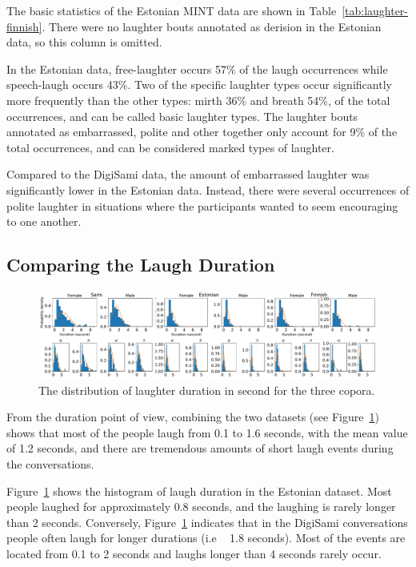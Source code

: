 \documentclass[10pt,journal,compsoc]{IEEEtran}
\begin{document}
The basic statistics of the Estonian MINT data are shown in Table~\ref{tab:laughter-finnish}.
There were no laughter bouts annotated as derision in the Estonian data, so this column is omitted.

In the Estonian data, free-laughter occurs 57\% of the laugh occurrences while speech-laugh occurs 43\%. Two of the specific laughter types occur significantly more frequently than the other types: mirth 36\% and breath 54\%, of the total occurrences, and can be called basic laughter types. The laughter bouts annotated as embarrassed, polite and other together only account for 9\% of the total occurrences, and can be considered marked types of laughter.

Compared to the DigiSami data, the amount of embarrassed laughter was significantly lower in the Estonian data. Instead, there were several occurrences of polite laughter in situations where the participants wanted to seem encouraging to one another.

\subsection{Comparing the Laugh Duration}
\label{sec:laugh-duration}

\begin{figure}[!t]
\centering
\includegraphics[width=1.02\linewidth]{figures/laugh_dist.pdf}
\caption{The distribution of laughter duration in second for the three copora.}
\label{fig:laugh-distribution}
\end{figure}

From the duration point of view, combining the two datasets (see Figure~\ref{fig:laugh-distribution}) shows that most of the people laugh from 0.1 to 1.6 seconds, with the mean value of 1.2 seconds, and there are tremendous amounts of short laugh events during the conversations.

Figure~\ref{fig:laugh-distribution} shows the histogram of laugh duration in the Estonian dataset.
Most people laughed for approximately 0.8 seconds, and the laughing is rarely longer than 2 seconds.
Conversely, Figure~\ref{fig:laugh-distribution} indicates that in the DigiSami conversations people often laugh for longer durations (i.e ~ 1.8 seconds). Most of the events are located from 0.1 to 2 seconds and laughs longer than 4 seconds rarely occur.
\end{document}
